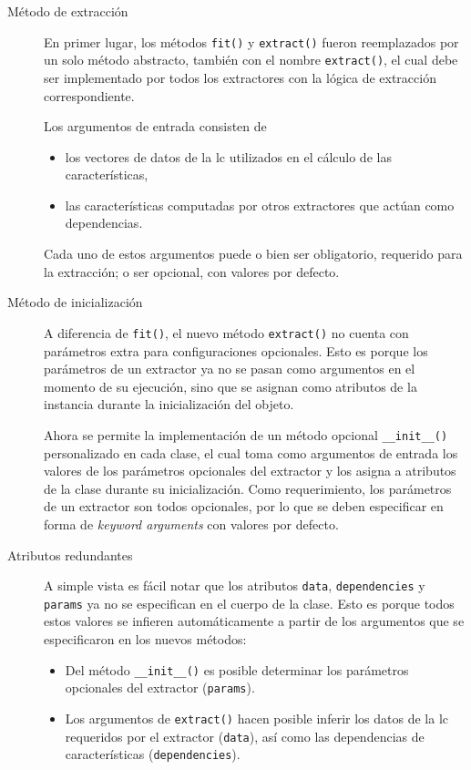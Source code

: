\begin{description}
    \item[Método de extracción] En primer lugar, los métodos \texttt{fit()} y \texttt{extract()} fueron reemplazados por un solo método abstracto, también con el nombre \texttt{extract()}, el cual debe ser implementado por todos los extractores con la lógica de extracción correspondiente.
    
    Los argumentos de entrada consisten de
    \begin{itemize}
        \item los vectores de datos de la \gls{lc} utilizados en el cálculo de las características,
        
        \item las características computadas por otros extractores que actúan como dependencias.
    \end{itemize}
    Cada uno de estos argumentos puede o bien ser obligatorio, requerido para la extracción; o ser opcional, con valores por defecto.

    \item[Método de inicialización] A diferencia de \texttt{fit()}, el nuevo método \texttt{extract()} no cuenta con parámetros extra para configuraciones opcionales. Esto es porque los parámetros de un extractor ya no se pasan como argumentos en el momento de su ejecución, sino que se asignan como atributos de la instancia durante la inicialización del objeto. 
    
    Ahora se permite la implementación de un método opcional \texttt{\_\_init\_\_()} personalizado en cada clase, el cual toma como argumentos de entrada los valores de los parámetros opcionales del extractor y los asigna a atributos de la clase durante su inicialización. Como requerimiento, los parámetros de un extractor son todos opcionales, por lo que se deben especificar en forma de \emph{keyword arguments} con valores por defecto.

    \item[Atributos redundantes] A simple vista es fácil notar que los atributos \texttt{data}, \texttt{dependencies} y \texttt{params} ya no se especifican en el cuerpo de la clase. Esto es porque todos estos valores se infieren automáticamente a partir de los argumentos que se especificaron en los nuevos métodos:

    \begin{itemize}
        \item Del método \texttt{\_\_init\_\_()} es posible determinar los parámetros opcionales del extractor (\texttt{params}).
        \item Los argumentos de \texttt{extract()} hacen posible inferir los datos de la \acrfull{lc} requeridos por el extractor (\texttt{data}), así como las dependencias de características (\texttt{dependencies}).
    \end{itemize}


\end{description}
